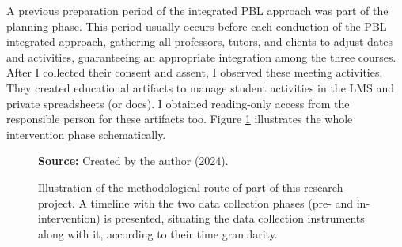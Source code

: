 
A previous preparation period of the integrated \gls{PBL} approach was part of the planning phase. This period usually occurs before each conduction of the PBL integrated approach, gathering all professors, tutors, and clients to adjust dates and activities, guaranteeing an appropriate integration among the three courses. After I collected their consent and assent, I observed these meeting activities. They created educational artifacts to manage student activities in the \gls{LMS} and private spreadsheets (or docs). I obtained reading-only access from the responsible person for these artifacts too. Figure \ref{fig:methodological-route} illustrates the whole intervention phase schematically. 

\begin{figure}[ht!]
\centering

\caption{\textmd{Illustration of the methodological route of part of this research project. A timeline with the two data collection phases (pre- and in-intervention) is presented, situating the data collection instruments along with it, according to their time granularity.}}
\label{fig:methodological-route}

\par\medskip\ABNTEXfontereduzida\selectfont\textbf{Source:} Created by the author (2024).
\end{figure}

